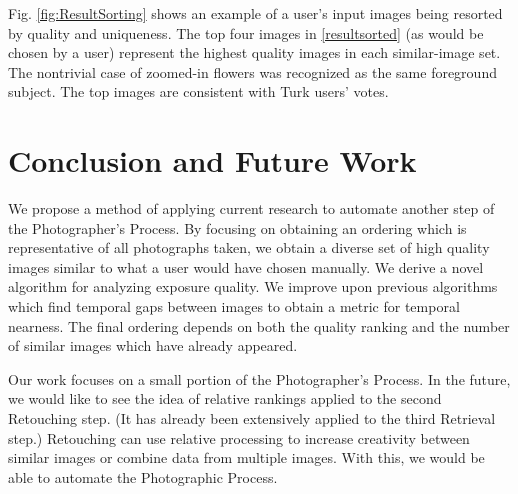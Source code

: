 \documentclass{article}
\begin{document}
Fig. \ref{fig:ResultSorting} shows an example of a user's input images being resorted by quality and uniqueness. The top four images in \ref{resultsorted} (as would be chosen by a user) represent the highest quality images in each similar-image set. The nontrivial case of zoomed-in flowers was recognized as the same foreground subject. The top images are consistent with Turk users' votes.


\section{Conclusion and Future Work}
We propose a method of applying current research to automate another step of the Photographer's Process. By focusing on obtaining an ordering which is representative of all photographs taken, we obtain a diverse set of high quality images similar to what a user would have chosen manually. We derive a novel algorithm for analyzing exposure quality. We improve upon previous algorithms which find temporal gaps between images to obtain a metric for temporal nearness. The final ordering depends on both the quality ranking and the number of similar images which have already appeared.

Our work focuses on a small portion of the Photographer's Process. In the future, we would like to see the idea of relative rankings applied to the second Retouching step. (It has already been extensively applied to the third Retrieval step.) Retouching can use relative processing to increase creativity between similar images or combine data from multiple images. With this, we would be able to automate the Photographic Process.

{\footnotesize
 
 
}
\end{document}
